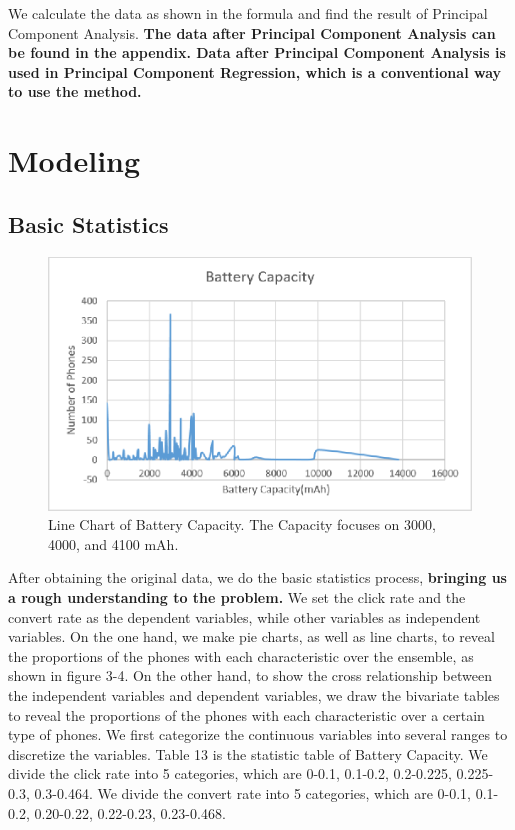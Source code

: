 We calculate the data as shown in the formula and find the result of Principal Component Analysis. \textbf{The data after Principal Component Analysis can be found in the appendix. Data after Principal Component Analysis is used in Principal Component Regression, which is a conventional way to use the method.}

\section{Modeling}

\subsection{Basic Statistics}

\begin{figure}[!ht]
	\centering
	\includegraphics[width=360pt]{fig3.eps}
	\caption{  Line Chart of Battery Capacity. The Capacity focuses on 3000, 4000, and 4100 mAh.}
	\label{fig3}
\end{figure}

After obtaining the original data, we do the basic statistics process, \textbf{bringing us a rough understanding to the problem.} We set the click rate and the convert rate as the dependent variables, while other variables as independent variables. On the one hand, we make pie charts, as well as line charts, to reveal the proportions of the phones with each characteristic over the ensemble, as shown in figure 3-4. On the other hand, to show the cross relationship between the independent variables and dependent variables, we draw the bivariate tables to reveal the proportions of the phones with each characteristic over a certain type of phones. We first categorize the continuous variables into several ranges to discretize the variables. Table 13 is the statistic table of Battery Capacity. We divide the click rate into 5 categories, which are 0-0.1, 0.1-0.2, 0.2-0.225, 0.225-0.3, 0.3-0.464. We divide the convert rate into 5 categories, which are 0-0.1, 0.1-0.2, 0.20-0.22, 0.22-0.23, 0.23-0.468. 

